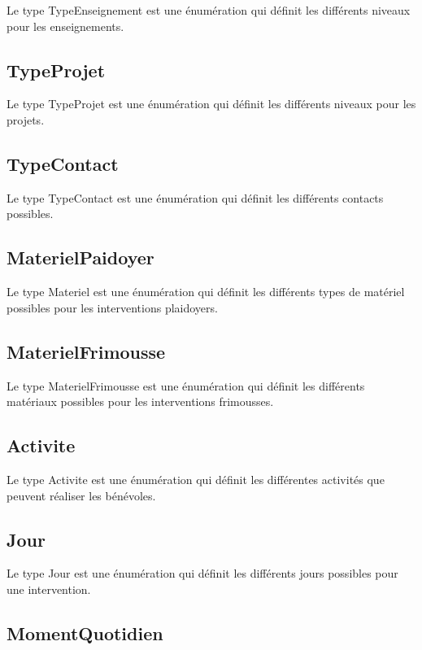\documentclass[asi, sansVersion]{picInsa}
\begin{document}
Le type TypeEnseignement est une énumération qui définit les différents niveaux pour les enseignements.

\subsection*{TypeProjet}

Le type TypeProjet est une énumération qui définit les différents niveaux pour les projets.

\subsection*{TypeContact}

Le type TypeContact est une énumération qui définit les différents contacts possibles.

\subsection*{MaterielPaidoyer}

Le type Materiel est une énumération qui définit les différents types de matériel possibles pour les interventions plaidoyers.

\subsection*{MaterielFrimousse}

Le type MaterielFrimousse est une énumération qui définit les différents matériaux possibles pour les interventions frimousses.

\subsection*{Activite}

Le type Activite est une énumération qui définit les différentes activités que peuvent réaliser les bénévoles.

\subsection*{Jour}

Le type Jour est une énumération qui définit les différents jours possibles pour une intervention.

\subsection*{MomentQuotidien}
\end{document}

